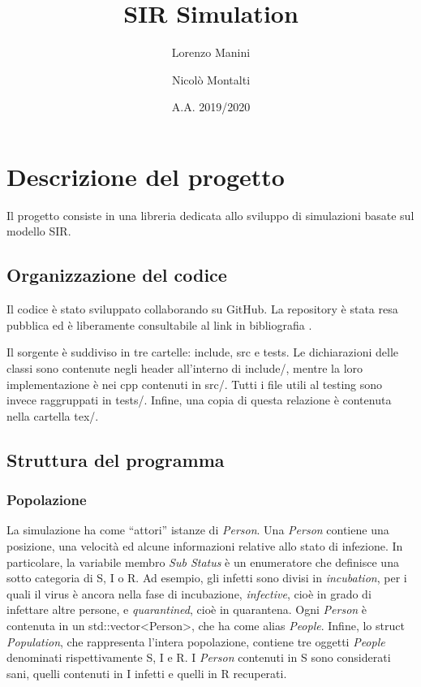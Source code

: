 \documentclass[a4paper,10pt,twocolumn]{article}
\begin{document}
\title{SIR Simulation}
\author{Lorenzo Manini \and Nicolò Montalti}
\date{A.A. 2019/2020}

\maketitle

\section{Descrizione del progetto}
Il progetto consiste in una libreria dedicata allo sviluppo di simulazioni basate sul modello SIR.

\subsection*{Organizzazione del codice}
Il codice è stato sviluppato collaborando su GitHub. La repository è stata resa pubblica ed è liberamente consultabile al link in bibliografia \cite{bib:GitHub}.

Il sorgente è suddiviso in tre cartelle: include, src e tests. Le dichiarazioni delle classi sono contenute negli header all'interno di include/, mentre la loro implementazione è nei cpp contenuti in src/. Tutti i file utili al testing sono invece raggruppati in tests/. Infine, una copia di questa relazione è contenuta nella cartella tex/.

\subsection*{Struttura del programma}
\subsubsection*{Popolazione}
La simulazione ha come “attori” istanze di \emph{Person}. Una \emph{Person} contiene una posizione, una velocità ed alcune informazioni relative allo stato di infezione. In particolare, la variabile membro \emph{Sub Status} è un enumeratore che definisce una sotto categoria di S, I o R. Ad esempio, gli infetti sono divisi in \emph{incubation}, per i quali il virus è ancora nella fase di incubazione, \emph{infective}, cioè in grado di infettare altre persone, e \emph{quarantined}, cioè in quarantena. Ogni \emph{Person} è contenuta in un std::vector<Person>, che ha come alias \emph{People}. Infine, lo struct \emph{Population}, che rappresenta l’intera popolazione, contiene tre oggetti \emph{People} denominati rispettivamente S, I e R. I \emph{Person} contenuti in S sono considerati sani, quelli contenuti in I infetti e quelli in R recuperati.
\end{document}
